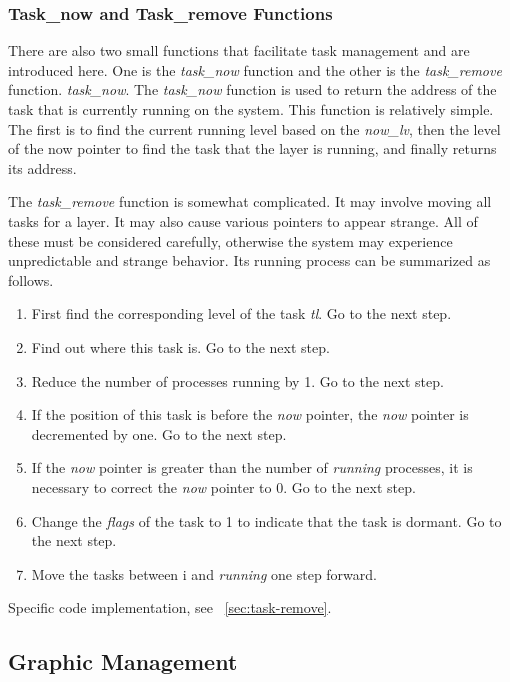 \documentclass{swfcthesis}
\begin{document}
\subsubsection{Task\_now and Task\_remove Functions}
\label{sec:taskn-taskr-funct}
There are also two small functions that facilitate task management and are introduced
here. One is the \emph{task\_now} function and the other is the \emph{task\_remove}
function. \emph{task\_now}. The \emph{task\_now} function is used to return the address of
the task that is currently running on the system. This function is relatively simple. The
first is to find the current running level based on the \emph{now\_lv}, then the level of
the now pointer to find the task that the layer is running, and finally returns its
address.

The \emph{task\_remove} function is somewhat complicated. It may involve moving all tasks
for a layer. It may also cause various pointers to appear strange. All of these must be
considered carefully, otherwise the system may experience unpredictable and strange
behavior. Its running process can be summarized as follows.
\begin{enumerate}
\item First find the corresponding level of the task \emph{tl}. Go to the next step.
\item Find out where this task is. Go to the next step.
\item Reduce the number of processes running by 1. Go to the next step.
\item If the position of this task is before the \emph{now} pointer, the \emph{now}
  pointer is decremented by one. Go to the next step.
\item If the \emph{now} pointer is greater than the number of \emph{running} processes, it
  is necessary to correct the \emph{now} pointer to 0. Go to the next step.
\item Change the \emph{flags} of the task to 1 to indicate that the task is dormant. Go to
  the next step.
\item Move the tasks between i and \emph{running} one step forward.
  
\end{enumerate}
Specific code implementation, see ~\ref{sec:task-remove}.

\subsection{Graphic Management}
\label{sec:graphic-management}
\end{document}
